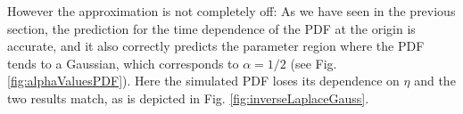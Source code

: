 However the approximation is not completely off: As we have seen in the previous section, the prediction for the time dependence of the \gls*{PDF} at the origin is accurate, and it also correctly predicts the parameter region where the \gls*{PDF} tends to a Gaussian, which corresponds to $\alpha = 1/2$ (see Fig. \ref{fig:alphaValuesPDF}). Here the simulated \gls*{PDF} loses its dependence on $\eta$ and the two results match, as is depicted in Fig. \ref{fig:inverseLaplaceGauss}.
